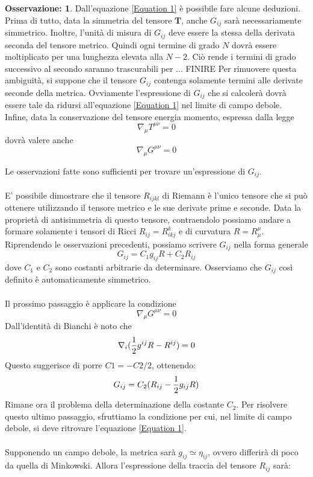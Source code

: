 \documentclass[]{report}
\theoremstyle{definition}
\theoremstyle{Theorem}
\theoremstyle{definition}
\theoremstyle{definition}
\theoremstyle{definition}
\newtheorem{Obs}[Def]{Osservazione:}
\begin{document}
\begin{Obs}
	Dall'equazione \ref{Equation 1} è possibile fare alcune deduzioni. Prima di tutto, data la simmetria del tensore $\textbf{T}$, anche $G_{ij}$ sarà necessariamente simmetrico. Inoltre, l'unità di misura di $G_{ij}$ deve essere la stessa della derivata seconda del tensore metrico. Quindi ogni termine di grado $N$ dovrà essere moltiplicato per una lunghezza elevata alla $N-2$. Ciò rende i termini di grado successivo al secondo saranno trascurabili per ... FINIRE
	Per rimuovere questa ambiguità, si suppone che il tensore $G_{ij}$ contenga solamente termini alle derivate seconde della metrica. Ovviamente l'espressione di $G_{ij}$ che si calcolerà dovrà essere tale da ridursi all'equazione \ref{Equation 1} nel limite di campo debole.\\
	Infine, data la conservazione del tensore energia momento, espressa dalla legge 
	$$\nabla_\mu T^{\mu\nu}=0$$
	dovrà valere anche 
	$$\nabla_\mu G^{\mu\nu}=0$$
\end{Obs}
Le osservazioni fatte sono sufficienti per trovare un'espressione di $G_{ij}$.\\
\\
E' possibile dimostrare che il tensore $R_{ijkl}$ di Riemann è l'unico tensore che si può ottenere utilizzando il tensore metrico e le sue derivate prime e seconde. Data la proprietà di antisimmetria di questo tensore, contraendolo possiamo andare a formare solamente i tensori di Ricci $R_{ij}=R^k_{ikj}$ e di curvatura $R=R^\mu_\mu$. Riprendendo le osservazioni precedenti, possiamo scrivere $G_{ij}$ nella forma generale
$$G_{ij}=C_1g_{ij}R+C_2R_{ij}$$
dove $C_1$ e $C_2$ sono costanti arbitrarie da determinare.
Osserviamo che $G_{ij}$ così definito è automaticamente simmetrico.\\
\\
Il prossimo passaggio è applicare la condizione $$\nabla_\mu G^{\mu\nu}=0$$
Dall'identità di Bianchi è noto che
$$\nabla_i({1\over 2}g^{ij}R-R^{ij})=0$$
Questo suggerisce di porre $C1=-C2/2$, ottenendo:
\begin{equation}
	\label{Equation 2}
	G_{ij}=C_2(R_{ij}-{1\over 2}g_{ij}R)
\end{equation}
Rimane ora il problema della determinazione della costante $C_2$. Per risolvere questo ultimo passaggio, sfruttiamo la condizione per cui, nel limite di campo debole, si deve ritrovare l'equazione \ref{Equation 1}.\\
\\
Supponendo un campo debole, la metrica sarà $g_{ij}\simeq \eta_{ij}$, ovvero differirà di poco da quella di Minkowski. Allora l'espressione della traccia del tensore $R_{ij}$ sarà:
\end{document}
